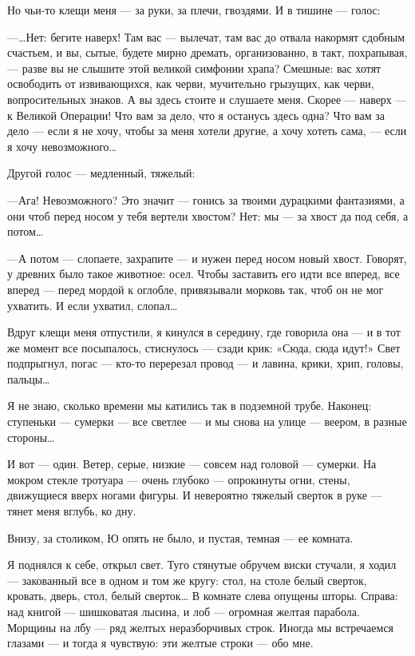 \documentclass[11pt,openany]{book}
\begin{document}
Но чьи-то клещи меня --- за руки, за плечи, гвоздями. И в тишине --- голос:

---\ldots{}Нет: бегите наверх! Там вас --- вылечат, там вас до отвала накормят сдобным счастьем, и вы, сытые, будете мирно дремать, организованно, в такт, похрапывая, --- разве вы не слышите этой великой симфонии храпа? Смешные: вас хотят освободить от извивающихся, как черви, мучительно грызущих, как черви, вопросительных знаков. А вы здесь стоите и слушаете меня. Скорее --- наверх --- к Великой Операции! Что вам за дело, что я останусь здесь одна? Что вам за дело --- если я не хочу, чтобы за меня хотели другие, а хочу хотеть сама, --- если я хочу невозможного\ldots{}

Другой голос --- медленный, тяжелый:

---Ага! Невозможного? Это значит --- гонись за твоими дурацкими фантазиями, а они чтоб перед носом у тебя вертели хвостом? Нет: мы --- за хвост да под себя, а потом\ldots{}

---А потом --- слопаете, захрапите --- и нужен перед носом новый хвост. Говорят, у древних было такое животное: осел. Чтобы заставить его идти все вперед, все вперед --- перед мордой к оглобле, привязывали морковь так, чтоб он не мог ухватить. И если ухватил, слопал\ldots{}

Вдруг клещи меня отпустили, я кинулся в середину, где говорила она --- и в тот же момент все посыпалось, стиснулось --- сзади крик: «Сюда, сюда идут!» Свет подпрыгнул, погас --- кто-то перерезал провод --- и лавина, крики, хрип, головы, пальцы\ldots{}

Я не знаю, сколько времени мы катились так в подземной трубе. Наконец: ступеньки --- сумерки --- все светлее --- и мы снова на улице --- веером, в разные стороны\ldots{}

И вот --- один. Ветер, серые, низкие --- совсем над головой --- сумерки. На мокром стекле тротуара --- очень глубоко --- опрокинуты огни, стены, движущиеся вверх ногами фигуры. И невероятно тяжелый сверток в руке --- тянет меня вглубь, ко дну.

Внизу, за столиком, Ю опять не было, и пустая, темная --- ее комната.

Я поднялся к себе, открыл свет. Туго стянутые обручем виски стучали, я ходил --- закованный все в одном и том же кругу: стол, на столе белый сверток, кровать, дверь, стол, белый сверток\ldots{} В комнате слева опущены шторы. Справа: над книгой --- шишковатая лысина, и лоб --- огромная желтая парабола. Морщины на лбу --- ряд желтых неразборчивых строк. Иногда мы встречаемся глазами --- и тогда я чувствую: эти желтые строки --- обо мне.
\end{document}
